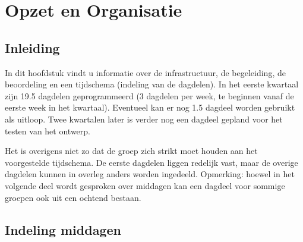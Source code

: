 \section{Opzet en Organisatie}
\subsection{Inleiding}
In dit hoofdstuk vindt u informatie over de infrastructuur, de begeleiding,
de beoordeling en een tijdschema (indeling van de dagdelen).
In het eerste kwartaal zijn 19.5 dagdelen geprogrammeerd
(3 dagdelen per week, te beginnen vanaf de eerste
week in het kwartaal).
Eventueel kan er nog 1.5 dagdeel worden gebruikt als uitloop.
Twee kwartalen later is verder nog een dagdeel gepland voor het 
testen van het ontwerp.

Het is overigens niet zo dat de groep zich
strikt moet houden aan het voorgestelde tijdschema. 
De eerste dagdelen liggen redelijk vast,
maar de overige dagdelen kunnen in overleg anders worden ingedeeld. 
Opmerking: hoewel in het volgende deel wordt gesproken over middagen
kan een dagdeel voor sommige groepen ook uit een ochtend bestaan.

\subsection{Indeling middagen}

